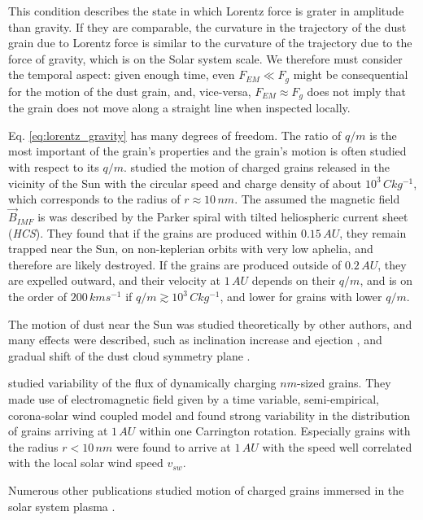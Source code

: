 This condition describes the state in which Lorentz force is grater in amplitude than gravity. If they are comparable, the curvature in the trajectory of the dust grain due to Lorentz force is similar to the curvature of the trajectory due to the force of gravity, which is on the Solar system scale. We therefore must consider the temporal aspect: given enough time, even $F_{EM} \ll F_g$ might be consequential for the motion of the dust grain, and, vice-versa, $F_{EM} \approx F_g$ does not imply that the grain does not move along a straight line when inspected locally. 

Eq. \ref{eq:lorentz_gravity} has many degrees of freedom. The ratio of $q/m$ is the most important of the grain's properties and the grain's motion is often studied with respect to its $q/m$. \citet{czechowski2010formation} studied the motion of charged grains released in the vicinity of the Sun with the circular speed and charge density of about $10^3 \, \si{C kg^{-1}}$, which corresponds to the radius of $r \approx 10 \, \si{nm}$. The assumed the magnetic field $\vec{B}_{IMF}$ is was described by the Parker spiral \citep{parker1958dynamics} with tilted heliospheric current sheet (\textit{HCS}). They found that if the grains are produced within $0.15 \, \si{AU}$, they remain trapped near the Sun, on non-keplerian orbits with very low aphelia, and therefore are likely destroyed. If the grains are produced outside of $0.2 \, \si{AU}$, they are expelled outward, and their velocity at $1 \, \si{AU}$ depends on their $q/m$, and is on the order of $200 \, \si{km s^{-1}}$ if $q/m \gtrsim 10^3 \, \si{C kg^{-1}}$, and lower for grains with lower $q/m$. 

The motion of dust near the Sun was studied theoretically by other authors, and many effects were described, such as inclination increase and ejection \citep{krivov1998dynamics}, and gradual shift of the dust cloud symmetry plane \citep{morfill1979motion}.

\citet{poppe2020effects} studied variability of the flux of dynamically charging $\si{nm}$-sized grains. They made use of electromagnetic field given by a time variable, semi-empirical, corona-solar wind coupled model and found strong variability in the distribution of grains arriving at $1 \, \si{AU}$ within one Carrington rotation. Especially grains with the radius $r<10 \, \si{nm}$ were found to arrive at $1 \, \si{AU}$ with the speed well correlated with the local solar wind speed $v_{sw}$. 

Numerous other publications studied motion of charged grains immersed in the solar system plasma \citep{mann2007nanoparticles,horanyi1996charged,juhasz2013dynamics,stamm2019dust,czechowski2021dynamics,poppe2022effects,rusk1988effect}.

